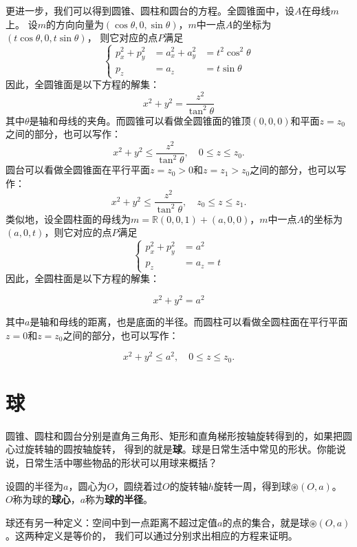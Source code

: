 \documentclass[12pt,UTF8]{ctexbook}
\begin{document}
更进一步，我们可以得到圆锥、圆柱和圆台的方程。全圆锥面中，设$A$在母线$m$上。
设$m$的方向向量为$(\cos{\theta}, 0, \sin{\theta})$，$m$中一点$A$的坐标为$(t\cos{\theta}, 0, t\sin{\theta})$，
则它对应的点$P$满足
$$
\left\{
\begin{array}{rll}
    p_x^2+p_y^2 &= a_x^2+a_y^2 &= t^2\cos^2{\theta} \\
    p_z &= a_z &= t\sin{\theta}
\end{array}
\right.
$$
因此，全圆锥面是以下方程的解集：
$$ x^2 + y^2 = \frac{z^2}{\tan^2{\theta}}$$
其中$\theta$是轴和母线的夹角。而圆锥可以看做全圆锥面的锥顶$( 0,0,0)$和平面$z=z_0$之间的部分，也可以写作：
$$ x^2 + y^2 \leqslant \frac{z^2}{\tan^2{\theta}} , \quad 0\leqslant z \leqslant z_0.$$
圆台可以看做全圆锥面在平行平面$z=z_0>0$和$z=z_1 > z_0$之间的部分，也可以写作：
$$ x^2 + y^2 \leqslant \frac{z^2}{\tan^2{\theta}} , \quad z_0\leqslant z \leqslant z_1.$$
类似地，设全圆柱面的母线为$m = \mathbb{R}(0,0,1)+(a,0,0)$，$m$中一点$A$的坐标为$(a, 0, t)$，则它对应的点$P$满足
$$
\left\{
\begin{array}{rl}
    p_x^2+p_y^2 &= a^2 \\
    p_z &= a_z = t
\end{array}
\right.
$$
因此，全圆柱面是以下方程的解集：

$$ x^2 + y^2 = a^2$$

其中$a$是轴和母线的距离，也是底面的半径。而圆柱可以看做全圆柱面在平行平面$z=0$和$z=z_0$之间的部分，也可以写作：

$$ x^2 + y^2 \leqslant a^2 , \quad 0\leqslant z \leqslant z_0.$$


\section{球}

圆锥、圆柱和圆台分别是直角三角形、矩形和直角梯形按轴旋转得到的，如果把圆心过旋转轴的圆按轴旋转，
得到的就是\textbf{球}。球是日常生活中常见的形状。你能说说，日常生活中哪些物品的形状可以用球来概括？

设圆的半径为$a$，圆心为$O$，圆绕着过$O$的旋转轴$h$旋转一周，得到球$\circledast(O,a)$。
$O$称为球的\textbf{球心}，$a$称为\textbf{球的半径}。

球还有另一种定义：空间中到一点距离不超过定值$a$的点的集合，就是球$\circledast(O,a)$。这两种定义是等价的，
我们可以通过分别求出相应的方程来证明。
\end{document}
